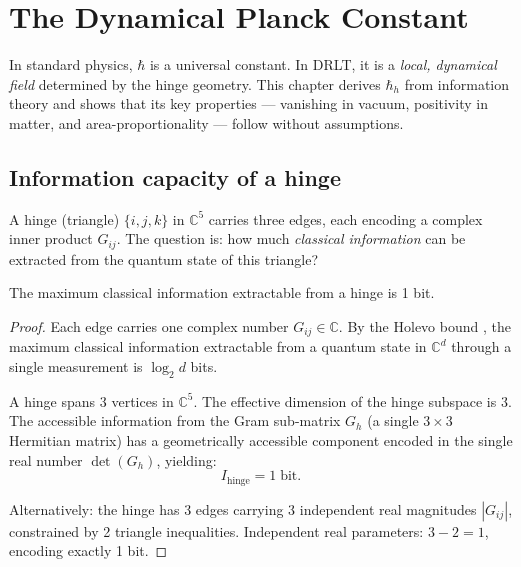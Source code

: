 \section{The Dynamical Planck Constant}
\label{ch:hbar}

In standard physics, $\hbar$ is a universal constant. In DRLT, it is a \emph{local, dynamical field} determined by the hinge geometry. This chapter derives $\hbar_h$ from information theory and shows that its key properties --- vanishing in vacuum, positivity in matter, and area-proportionality --- follow without assumptions.

\subsection{Information capacity of a hinge}

A hinge (triangle) $\{i, j, k\}$ in $\mathbb{C}^5$ carries three edges, each encoding a complex inner product $G_{ij}$. The question is: how much \emph{classical information} can be extracted from the quantum state of this triangle?

\begin{theorem}
\label{thm:holevo}
The maximum classical information extractable from a hinge is 1 bit.
\end{theorem}

\begin{proof}
Each edge carries one complex number $G_{ij} \in \mathbb{C}$. By the Holevo bound \cite{Holevo}, the maximum classical information extractable from a quantum state in $\mathbb{C}^d$ through a single measurement is $\log_2 d$ bits.

A hinge spans 3 vertices in $\mathbb{C}^5$. The effective dimension of the hinge subspace is 3. The accessible information from the Gram sub-matrix $G_h$ (a single $3\times 3$ Hermitian matrix) has a geometrically accessible component encoded in the single real number $\det(G_h)$, yielding:
\begin{equation}
I_\text{hinge} = 1\;\text{bit}.
\end{equation}

Alternatively: the hinge has 3 edges carrying 3 independent real magnitudes $|G_{ij}|$, constrained by 2 triangle inequalities. Independent real parameters: $3 - 2 = 1$, encoding exactly 1 bit.
\end{proof}

